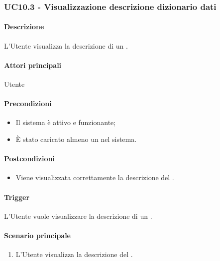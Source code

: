 \subsubsection{UC10.3 - Visualizzazione descrizione dizionario dati}\label{UC10point3}
\paragraph*{Descrizione}
L'Utente visualizza la descrizione di un .

\paragraph*{Attori principali}
Utente

\paragraph*{Precondizioni}
\begin{itemize}
  \item Il sistema è attivo e funzionante;
  \item È stato caricato almeno un  nel sistema. 
\end{itemize}

\paragraph*{Postcondizioni}
\begin{itemize}
  \item Viene visualizzata correttamente la descrizione del .
\end{itemize}

\paragraph*{Trigger}
L'Utente vuole visualizzare la descrizione di un .

\paragraph*{Scenario principale}
\begin{enumerate}
  \item L'Utente visualizza la descrizione del .
\end{enumerate}


